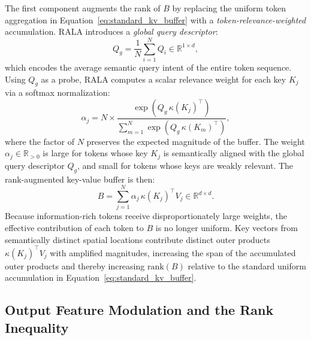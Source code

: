The first component augments the rank of $B$ by replacing the uniform token
aggregation in Equation~\ref{eq:standard_kv_buffer} with a
\emph{token-relevance-weighted} accumulation. RALA introduces a
\emph{global query descriptor}:
\begin{equation}
Q_g = \frac{1}{N} \sum_{i=1}^{N} Q_i \in \mathbb{R}^{1 \times d},
\label{eq:global_query}
\end{equation}
which encodes the average semantic query intent of the entire token sequence.
Using $Q_g$ as a probe, RALA computes a scalar relevance weight for each key
$K_j$ via a softmax normalization:
\begin{equation}
\alpha_j = N \times
    \frac{\exp\!\left(Q_g \,\kappa(K_j)^\top\right)}
    {\displaystyle\sum_{m=1}^{N} \exp\!\left(Q_g \,\kappa(K_m)^\top\right)},
\label{eq:alpha_softmax}
\end{equation}
where the factor of $N$ preserves the expected magnitude of the buffer. The
weight $\alpha_j \in \mathbb{R}_{>0}$ is large for tokens whose key $K_j$
is semantically aligned with the global query descriptor $Q_g$, and small for
tokens whose keys are weakly relevant. The rank-augmented key-value buffer
is then:
\begin{equation}
B = \sum_{j=1}^{N} \alpha_j \, \kappa(K_j)^\top V_j \in \mathbb{R}^{d \times d}.
\label{eq:rala_buffer}
\end{equation}
Because information-rich tokens receive disproportionately large weights, the
effective contribution of each token to $B$ is no longer uniform. Key vectors
from semantically distinct spatial locations contribute distinct outer products
$\kappa(K_j)^\top V_j$ with amplified magnitudes, increasing the span of the
accumulated outer products and thereby increasing $\mathrm{rank}(B)$ relative
to the standard uniform accumulation in Equation~\ref{eq:standard_kv_buffer}.

\subsection{Output Feature Modulation and the Rank Inequality}

